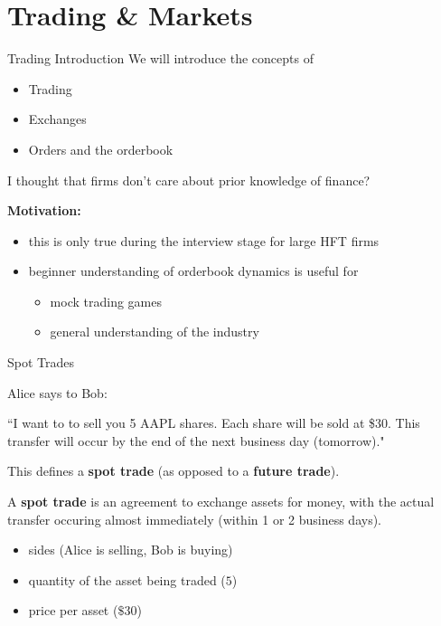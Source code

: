 \section{Trading \& Markets}

\begin{frame}{Trading Introduction}
  We will introduce the concepts of
  \begin{itemize}
    \item Trading
    \item Exchanges
    \item Orders and the orderbook
  \end{itemize}

  \vspace{0.3cm}

  \textcolor{sqt-question}{
    I thought that firms don't care about prior knowledge of finance?
  }

  \vspace{0.3cm}

  \textbf{Motivation:}
  \begin{itemize}
    \item this is only true during the interview stage for large HFT firms
    \item beginner understanding of orderbook dynamics is useful for
    \begin{itemize}
      \item mock trading games
      \item general understanding of the industry
    \end{itemize}
  \end{itemize}
\end{frame}

\begin{frame}{Spot Trades}
  \begin{sqt:tip}
    Alice says to Bob:
    \begin{center}
      ``I want to to sell you 5 AAPL shares. Each share will be sold at \$30.
      This transfer will occur by the end of the next business day (tomorrow)."
    \end{center}
  \end{sqt:tip}

  This defines a \textbf{spot trade} (as opposed to a \textbf{future trade}).

  \begin{sqt:definition}
    A \textbf{spot trade} is an agreement to exchange assets for money, with
    the actual transfer occuring almost immediately (within 1 or 2 business days).
    \begin{itemize}
      \item sides (Alice is selling, Bob is buying)
      \item quantity of the asset being traded ($5$)
      \item price per asset ($\$30$)
    \end{itemize}
  \end{sqt:definition}
\end{frame}

